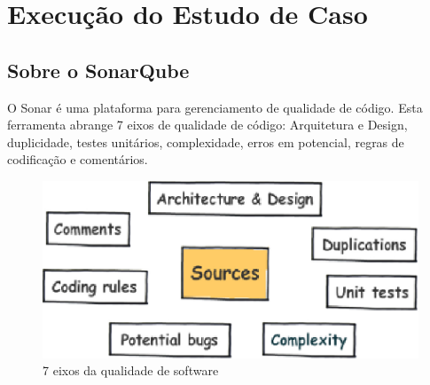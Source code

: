 \chapter{Execução do Estudo de Caso}
\label{chap:execucao}

\section{Sobre o SonarQube}

O Sonar é uma plataforma para gerenciamento de qualidade de código. Esta ferramenta abrange 7 eixos de qualidade de código: Arquitetura e Design, duplicidade, testes unitários, complexidade, erros em potencial, regras de codificação e comentários.

\begin{figure}[h!]
\centering
\includegraphics[keepaspectratio=false,scale=0.90]{figuras/figuras_nilton/eixosqualidade.eps}
\caption{7 eixos da qualidade de software 
}
\label{7eixosqualidade}
\end{figure}
